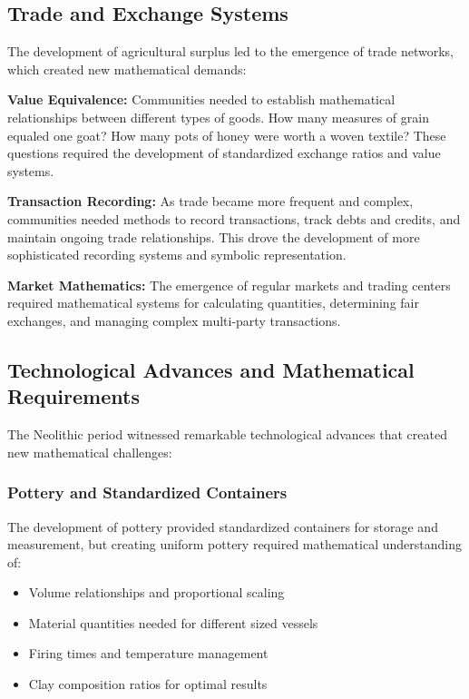 \documentclass[12pt, oneside, openany]{book}
\begin{document}
\subsection{Trade and Exchange Systems}

The development of agricultural surplus led to the emergence of trade networks, which created new mathematical demands:

\textbf{Value Equivalence:} Communities needed to establish mathematical relationships between different types of goods. How many measures of grain equaled one goat? How many pots of honey were worth a woven textile? These questions required the development of standardized exchange ratios and value systems.

\textbf{Transaction Recording:} As trade became more frequent and complex, communities needed methods to record transactions, track debts and credits, and maintain ongoing trade relationships. This drove the development of more sophisticated recording systems and symbolic representation.

\textbf{Market Mathematics:} The emergence of regular markets and trading centers required mathematical systems for calculating quantities, determining fair exchanges, and managing complex multi-party transactions.

\subsection{Technological Advances and Mathematical Requirements}

The Neolithic period witnessed remarkable technological advances that created new mathematical challenges:

\subsubsection{Pottery and Standardized Containers}

The development of pottery provided standardized containers for storage and measurement, but creating uniform pottery required mathematical understanding of:
\begin{itemize}
	\item Volume relationships and proportional scaling
	\item Material quantities needed for different sized vessels
	\item Firing times and temperature management
	\item Clay composition ratios for optimal results
\end{itemize}
\end{document}
